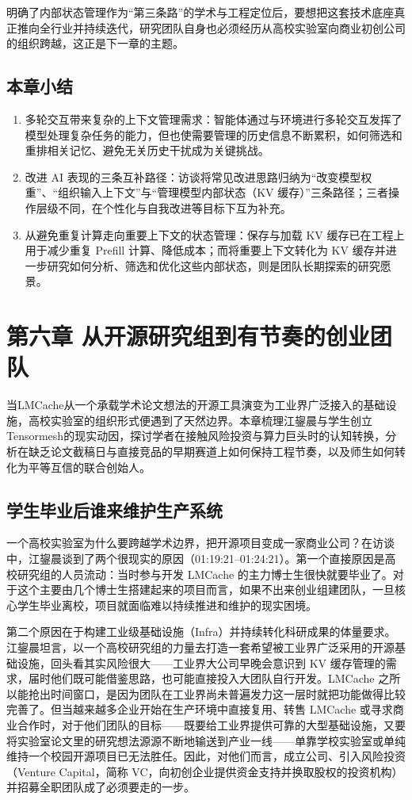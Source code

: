 \documentclass[UTF8,a4paper,11pt,fontset=fandol]{ctexart}
\begin{document}
明确了内部状态管理作为“第三条路”的学术与工程定位后，要想把这套技术底座真正推向全行业并持续迭代，研究团队自身也必须经历从高校实验室向商业初创公司的组织跨越，这正是下一章的主题。
\subsection{本章小结}
\begin{enumerate}
\item 多轮交互带来复杂的上下文管理需求：智能体通过与环境进行多轮交互发挥了模型处理复杂任务的能力，但也使需要管理的历史信息不断累积，如何筛选和重排相关记忆、避免无关历史干扰成为关键挑战。
\item 改进 AI 表现的三条互补路径：访谈将常见改进思路归纳为“改变模型权重”、“组织输入上下文”与“管理模型内部状态（KV 缓存）”三条路径；三者操作层级不同，在个性化与自我改进等目标下互为补充。
\item 从避免重复计算走向重要上下文的状态管理：保存与加载 KV 缓存已在工程上用于减少重复 Prefill 计算、降低成本；而将重要上下文转化为 KV 缓存并进一步研究如何分析、筛选和优化这些内部状态，则是团队长期探索的研究愿景。
\end{enumerate}
\section{第六章 从开源研究组到有节奏的创业团队}
当LMCache从一个承载学术论文想法的开源工具演变为工业界广泛接入的基础设施，高校实验室的组织形式便遇到了天然边界。本章梳理江鋆晨与学生创立Tensormesh的现实动因，探讨学者在接触风险投资与算力巨头时的认知转换，分析在缺乏论文截稿日与直接竞品的早期赛道上如何保持工程节奏，以及师生如何转化为平等互信的联合创始人。
\subsection{学生毕业后谁来维护生产系统}
一个高校实验室为什么要跨越学术边界，把开源项目变成一家商业公司？在访谈中，江鋆晨谈到了两个很现实的原因（01:19:21–01:24:21）。第一个直接原因是高校研究组的人员流动：当时参与开发 LMCache 的主力博士生很快就要毕业了。对于这个主要由几个博士生搭建起来的项目而言，如果不出来创业组建团队，一旦核心学生毕业离校，项目就面临难以持续推进和维护的现实困境。

第二个原因在于构建工业级基础设施（Infra）并持续转化科研成果的体量要求。江鋆晨坦言，以一个高校研究组的力量去打造一套希望被工业界广泛采用的开源基础设施，回头看其实风险很大——工业界大公司早晚会意识到 KV 缓存管理的需求，届时他们既可能借鉴思路，也可能直接投入大团队自行开发。LMCache 之所以能抢出时间窗口，是因为团队在工业界尚未普遍发力这一层时就把功能做得比较完善了。但当越来越多企业开始在生产环境中直接复用、转售 LMCache 或寻求商业合作时，对于他们团队的目标——既要给工业界提供可靠的大型基础设施，又要将实验室论文里的研究想法源源不断地输送到产业一线——单靠学校实验室或单纯维持一个校园开源项目已无法胜任。因此，对他们而言，成立公司、引入风险投资（Venture Capital，简称 VC，向初创企业提供资金支持并换取股权的投资机构）并招募全职团队成了必须要走的一步。
\end{document}

